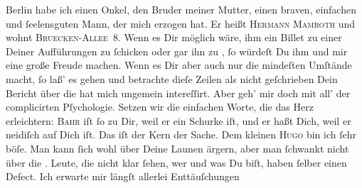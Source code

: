 \begin{ledgroupsized}[t]{13cm}
                  Berlin habe ich einen Onkel, den Bruder meiner Mutter, einen braven, einfachen und  ſeelensguten {\pb}Mann\strikeout{\textcolor{gray}{e}}, der mich erzogen hat. Er heißt \textsc{Hermann Mamroth} und wohnt \textsc{Bruecken-Allee} 8. Wenn es Dir möglich wäre, ihm ein
               Billet zu einer Deiner Aufführungen zu ſchicken oder gar ihn zu \label{K_L02766-7v}\label{K_L02766-7h}, ſo würdeſt  Du ihm und mir eine große Freude machen. Wenn es Dir
               aber auch nur die mindeſten Umſtände macht, ſo laß’  es gehen {\pb}und betrachte dieſe Zeilen
               als nicht geſchrieben{\dotsfive}\pend
           \pstart
           Dein Bericht über die \label{K_L02766-5v}\label{K_L02766-5h} hat mich ungemein intereſſirt. Aber geh’ mir doch mit all’ der complicirten
               Pſychologie. Setzen wir die einfachen Worte, die das Herz erleichtern: \textsc{Bahr} iſt ſo zu Dir,  weil er ein Schurke iſt,
               und er haßt Dich, weil er neidiſch auf Dich iſt. Das iſt der Kern der Sache. Dem
               kleinen {\pb}\textsc{Hugo} bin ich ſehr böſe. Man kann ſich wohl über Deine  Launen ärgern, aber man ſchwankt nicht über die \label{K_L02766-6v}\label{K_L02766-6h}. Leute, die nicht klar ſehen, wer und was Du biſt, haben ſelber einen Defect.
               Ich erwarte mir längſt allerlei Enttäuſchungen 

\end{ledgroupsized}
